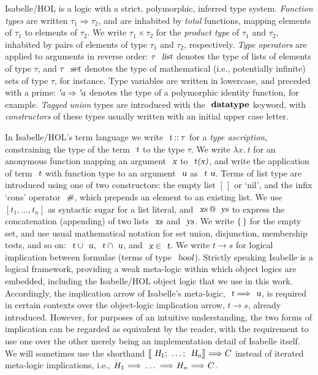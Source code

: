 Isabelle/HOL is a logic with a strict, polymorphic, inferred type system.
\emph{Function types} are written $\tau_1 \Rightarrow \tau_2$, and are inhabited by \emph{total} functions, mapping elements of $\tau_1$ to elements of $\tau_2$.
We write $\tau_1 \times \tau_2$ for the \emph{product type} of $\tau_1$ and $\tau_2$, inhabited by pairs of elements of type $\tau_1$ and $\tau_2$, respectively.
\emph{Type operators} are applied to arguments in reverse order: $\tau\ \isa{list}$ denotes the type of lists of elements of type $\tau$, and $\tau\ \isa{set}$ denotes the type of mathematical (i.e., potentially infinite) sets of type $\tau$, for instance.
Type variables are written in lowercase, and preceded with a prime: ${\emph{$\mskip2mu{'}\mskip-2mu$}}a \Rightarrow {\emph{$\mskip2mu{'}\mskip-2mu$}}a$ denotes the type of a polymorphic identity function, for example.
\emph{Tagged union} types are introduced with the $\isacommand{datatype}$ keyword, with \emph{constructors} of these types usually written with an initial upper case letter.

In Isabelle/HOL's term language we write $\isa{t} \mathbin{::} \tau$ for a \emph{type ascription}, constraining the type of the term $\isa{t}$ to the type $\tau$.
We write $\lambda{x}.\: t$ for an anonymous function mapping an argument $\isa{x}$ to $\isa{t(x)}$, and write the application of term $\isa{t}$ with function type to an argument $\isa{u}$ as $\isa{t\ u}$.
Terms of list type are introduced using one of two constructors: the empty list $[\,]$ or `nil', and the infix `cons' operator $\isa{\#}$, which prepends an element to an existing list.
We use $[t_1, \ldots, t_n]$ as syntactic sugar for a list literal, and $\isa{xs} \mathbin{\isacharat} \isa{ys}$ to express the concatenation (appending) of two lists $\isa{xs}$ and $\isa{ys}$.
We write $\{\,\}$ for the empty set, and use usual mathematical notation for set union, disjunction, membership tests, and so on: $\isa{t} \cup \isa{u}$, $\isa{t} \cap \isa{u}$, and $\isa{x} \in \isa{t}$.
We write $t \longrightarrow s$ for logical implication between formulae (terms of type $\isa{bool}$).
Strictly speaking Isabelle is a logical framework, providing a weak meta-logic within which object logics are embedded, including the Isabelle/HOL object logic that we use in this work.
Accordingly, the implication arrow of Isabelle's meta-logic, $\isa{t} \Longrightarrow \isa{u}$, is required in certain contexts over the object-logic implication arrow, $t \longrightarrow s$, already introduced.
However, for purposes of an intuitive understanding, the two forms of implication can be regarded as equivalent by the reader, with the requirement to use one over the other merely being an implementation detail of Isabelle itself.
We will sometimes use the shorthand ${\isasymlbrakk}\isa{H}_1{\isacharsemicolon}\ \ldots{\isacharsemicolon}\ \isa{H}_n{\isasymrbrakk}\ {\isasymLongrightarrow}\ C$ instead of iterated meta-logic implications, i.e., $H_1\ {\isasymLongrightarrow}\ \ldots\ {\isasymLongrightarrow}\ H_n\ {\isasymLongrightarrow}\ C$.

